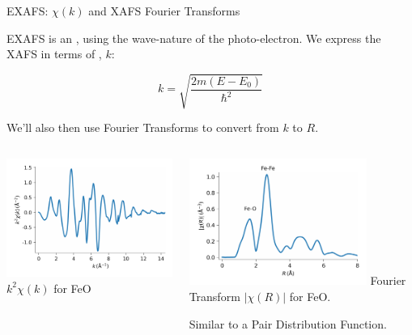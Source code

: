 
\begin{slide}{EXAFS: $\chi(k)$ and XAFS Fourier Transforms}

  \begin{cenpage}{120mm}

    EXAFS is an {}, using the wave-nature of
    the photo-electron.  We express the XAFS in terms of
    {}, ${k}$:

    \[  k= \sqrt{  \frac{2m(E-E_0)}{ {\hbar}^2} } \]

We'll also then use Fourier Transforms to convert from $k$ to  $R$.
\vmm



   \begin{columns}[T]
     \begin{column}{65mm}
       \includegraphics[width=58mm]{figs/rimg/feo_chik}
       \hspace{10mm} $k^2\chi(k)$ for FeO       
     \end{column}
     \begin{column}{65mm}
       \includegraphics[width=58mm]{figs/rimg/feo_chir}
       \hspace{10mm}   Fourier Transform $|\chi(R)|$ for FeO. \par
       Similar to a Pair Distribution Function.
       
     \end{column}     
   \end{columns}


\end{cenpage}

\end{slide}
